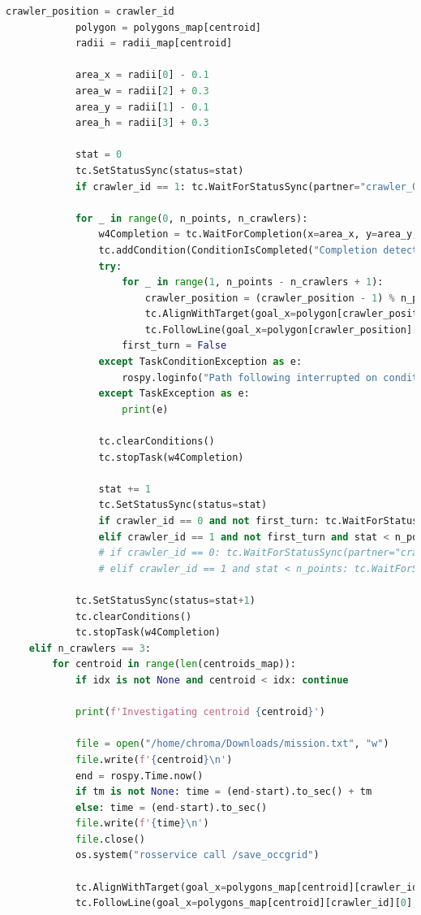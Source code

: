 \documentclass[francais,RandD]{rapportPFE}
\begin{document}
\begin{lstlisting}[language=Python,caption={Implémentation de l'algorithme d'investigation polygonale},label=lst:investigation_polygonale]
			crawler_position = crawler_id
			polygon = polygons_map[centroid]
			radii = radii_map[centroid]

			area_x = radii[0] - 0.1
			area_w = radii[2] + 0.3
			area_y = radii[1] - 0.1
			area_h = radii[3] + 0.3

			stat = 0
			tc.SetStatusSync(status=stat)
			if crawler_id == 1: tc.WaitForStatusSync(partner="crawler_0", status=stat+1)

			for _ in range(0, n_points, n_crawlers):
				w4Completion = tc.WaitForCompletion(x=area_x, y=area_y, w=area_w, h=area_h, foreground=False)
				tc.addCondition(ConditionIsCompleted("Completion detector", tc, w4Completion))
				try:
					for _ in range(1, n_points - n_crawlers + 1):
						crawler_position = (crawler_position - 1) % n_points
						tc.AlignWithTarget(goal_x=polygon[crawler_position][0], goal_y=polygon[crawler_position][1])
						tc.FollowLine(goal_x=polygon[crawler_position][0], goal_y=polygon[crawler_position][1], max_velocity=investigation_velocity)
					first_turn = False
				except TaskConditionException as e:
					rospy.loginfo("Path following interrupted on condition: %s" % " or ".join([str(c) for c in e.conditions]))
				except TaskException as e:
					print(e)

				tc.clearConditions()
				tc.stopTask(w4Completion)

				stat += 1
				tc.SetStatusSync(status=stat)
				if crawler_id == 0 and not first_turn: tc.WaitForStatusSync(partner="crawler_1", status=stat)
				elif crawler_id == 1 and not first_turn and stat < n_points: tc.WaitForStatusSync(partner="crawler_0", status=stat+1)
				# if crawler_id == 0: tc.WaitForStatusSync(partner="crawler_1", status=stat)
				# elif crawler_id == 1 and stat < n_points: tc.WaitForStatusSync(partner="crawler_0", status=stat+1)

			tc.SetStatusSync(status=stat+1)
			tc.clearConditions()
			tc.stopTask(w4Completion)
	elif n_crawlers == 3:
		for centroid in range(len(centroids_map)):
			if idx is not None and centroid < idx: continue

			print(f'Investigating centroid {centroid}')

			file = open("/home/chroma/Downloads/mission.txt", "w")
			file.write(f'{centroid}\n')
			end = rospy.Time.now()
			if tm is not None: time = (end-start).to_sec() + tm
			else: time = (end-start).to_sec()
			file.write(f'{time}\n')
			file.close()
			os.system("rosservice call /save_occgrid")

			tc.AlignWithTarget(goal_x=polygons_map[centroid][crawler_id][0], goal_y=polygons_map[centroid][crawler_id][1], angle_threshold=0.05)
			tc.FollowLine(goal_x=polygons_map[centroid][crawler_id][0], goal_y=polygons_map[centroid][crawler_id][1], max_velocity=cruise_velocity)


\end{lstlisting}
\end{document}
